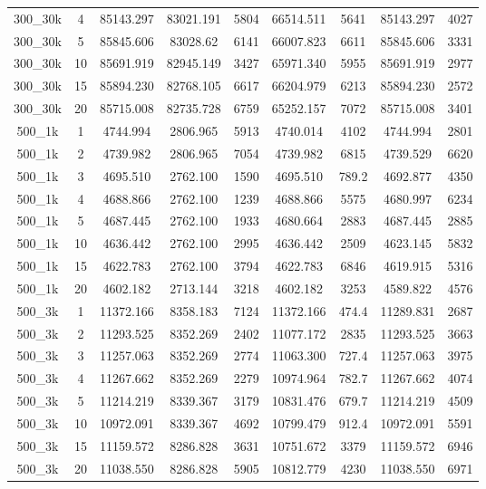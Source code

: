\documentclass[10pt]{article}
\begin{document}
\begin{table}[h]
\begin{tabular}{ccc|cc|cc|cc}
{300\_30k} & {4} & {85143.297} & {83021.191} & {5804} & {66514.511} & {5641} & {85143.297} & {4027}\tabularnewline
{300\_30k} & {5} & {85845.606} & {83028.62} & {6141} & {66007.823} & {6611} & {85845.606} & {3331}\tabularnewline
{300\_30k} & {10} & {85691.919} & {82945.149} & {3427} & {65971.340} & {5955} & {85691.919} & {2977}\tabularnewline
{300\_30k} & {15} & {85894.230} & {82768.105} & {6617} & {66204.979} & {6213} & {85894.230} & {2572}\tabularnewline
{300\_30k} & {20} & {85715.008} & {82735.728} & {6759} & {65252.157} & {7072} & {85715.008} & {3401}\tabularnewline
\hline 
{500\_1k} & {1} & {4744.994} & {2806.965} & {5913} & {4740.014} & {4102} & {4744.994} & {2801}\tabularnewline
{500\_1k} & {2} & {4739.982} & {2806.965} & {7054} & {4739.982} & {6815} & {4739.529} & {6620}\tabularnewline
{500\_1k} & {3} & {4695.510} & {2762.100} & {1590} & {4695.510} & {789.2} & {4692.877} & {4350}\tabularnewline
{500\_1k} & {4} & {4688.866} & {2762.100} & {1239} & {4688.866} & {5575} & {4680.997} & {6234}\tabularnewline
{500\_1k} & {5} & {4687.445} & {2762.100} & {1933} & {4680.664} & {2883} & {4687.445} & {2885}\tabularnewline
{500\_1k} & {10} & {4636.442} & {2762.100} & {2995} & {4636.442} & {2509} & {4623.145} & {5832}\tabularnewline
{500\_1k} & {15} & {4622.783} & {2762.100} & {3794} & {4622.783} & {6846} & {4619.915} & {5316}\tabularnewline
{500\_1k} & {20} & {4602.182} & {2713.144} & {3218} & {4602.182} & {3253} & {4589.822} & {4576}\tabularnewline
\hline 
{500\_3k} & {1} & {11372.166} & {8358.183} & {7124} & {11372.166} & {474.4} & {11289.831} & {2687}\tabularnewline
{500\_3k} & {2} & {11293.525} & {8352.269} & {2402} & {11077.172} & {2835} & {11293.525} & {3663}\tabularnewline
{500\_3k} & {3} & {11257.063} & {8352.269} & {2774} & {11063.300} & {727.4} & {11257.063} & {3975}\tabularnewline
{500\_3k} & {4} & {11267.662} & {8352.269} & {2279} & {10974.964} & {782.7} & {11267.662} & {4074}\tabularnewline
{500\_3k} & {5} & {11214.219} & {8339.367} & {3179} & {10831.476} & {679.7} & {11214.219} & {4509}\tabularnewline
{500\_3k} & {10} & {10972.091} & {8339.367} & {4692} & {10799.479} & {912.4} & {10972.091} & {5591}\tabularnewline
{500\_3k} & {15} & {11159.572} & {8286.828} & {3631} & {10751.672} & {3379} & {11159.572} & {6946}\tabularnewline
{500\_3k} & {20} & {11038.550} & {8286.828} & {5905} & {10812.779} & {4230} & {11038.550} & {6971}\tabularnewline
\end{tabular}
\end{table}
\end{document}
